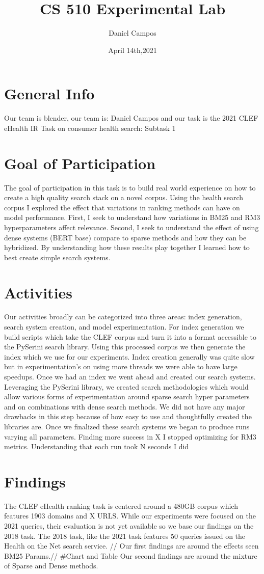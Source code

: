 \documentclass[11pt]{article}
\title{CS 510 Experimental Lab}
\author{Daniel Campos}
\date{April 14th,2021}
\begin{document}
\maketitle
\section{General Info}
Our team is blender, our team is: Daniel Campos and our task is the 2021 CLEF eHealth IR Task on consumer health search: Subtask 1
\section{Goal of Participation}
The goal of participation in this task is to build real world experience on how to create a high quality search stack on a novel corpus. Using the health search corpus I explored the effect that variations in ranking methods can have on model performance. First, I seek to understand how variations in BM25 and RM3 hyperparameters affect relevance. Second, I seek to understand the effect of using dense systems (BERT base) compare to sparse methods and how they can be hybridized. By understanding how these results play together I learned how to best create simple search systems. 
\section{Activities}
Our activities broadly can be categorized into three areas: index generation, search system creation, and model experimentation. For index generation we build scripts which take the CLEF corpus and turn it into a format accessible to the PySerini search library. Using this processed corpus we then generate the index which we use for our experiments. Index creation generally was quite slow but in experimentation's on using more threads we were able to have large speedups. Once we had an index we went ahead and created our search systems. Leveraging the PySerini library, we created search methodologies which would allow various forms of experimentation around sparse search hyper parameters and on combinations with dense search methods. We did not have any major drawbacks in this step because of how easy to use and thoughtfully created the libraries are. Once we finalized these search systems we began to produce runs varying all parameters.
Finding more success in X I stopped optimizing for RM3 metrics. Understanding that each run took N seconds I did 
\section{Findings}
The CLEF eHealth ranking task is centered around a 480GB corpus which features 1903 domains and X URLS. While our experiments were focused on the 2021 queries, their evaluation is not yet available so we base our findings on the 2018 task. The 2018 task, like the 2021 task features 50 queries issued on the Health on the Net search service. //
Our first findings are around the effects seen BM25 Params.//
#Chart and Table
Our second findings are around the mixture of Sparse and Dense methods.
\end{document}
